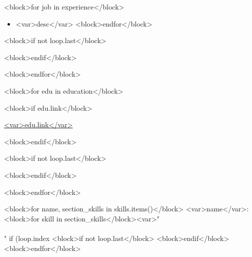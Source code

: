 \documentclass[10pt,a4paper,ragged2e,withhyper]{altacv}
\begin{document}
\begin{paracol}{1}

  <block>for job in experience</block>
  \begin{itemize}
    <block>for desc in job.descriptions</block>
    \item <var>desc</var>
    <block>endfor</block>
  \end{itemize}

  <block>if not loop.last</block>

  \divider

  <block>endif</block>

  <block>endfor</block>

  \medskip


  <block>for edu in education</block>


  <block>if edu.link</block>

    \href{<var>edu.link</var>}{<var>edu.link</var>}

  <block>endif</block>
  
  <block>if not loop.last</block>

  \divider

  <block>endif</block>

  <block>endfor</block>

  \medskip


  <block>for name, section_skills in skills.items()</block>
    <var>name</var>: <block>for skill in section_skills</block><var>"\\\\" if (loop.index %
  <block>if not loop.last</block>
  \smallskip
  <block>endif</block>
  <block>endfor</block>

\end{paracol}
\end{document}
